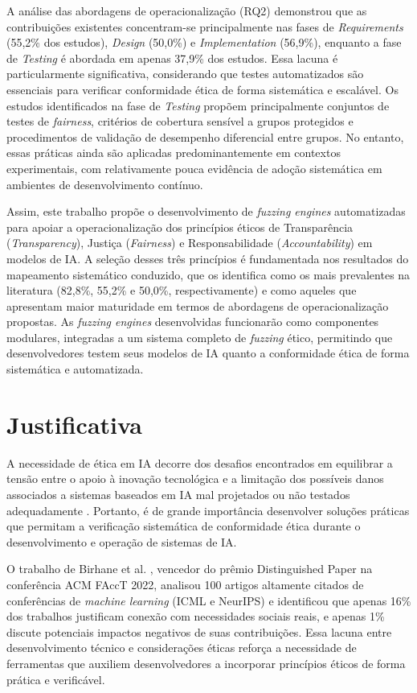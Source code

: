 A análise das abordagens de operacionalização (RQ2) demonstrou que as contribuições existentes concentram-se principalmente nas fases de \textit{Requirements} (55,2\% dos estudos), \textit{Design} (50,0\%) e \textit{Implementation} (56,9\%), enquanto a fase de \textit{Testing} é abordada em apenas 37,9\% dos estudos. Essa lacuna é particularmente significativa, considerando que testes automatizados são essenciais para verificar conformidade ética de forma sistemática e escalável. Os estudos identificados na fase de \textit{Testing} propõem principalmente conjuntos de testes de \textit{fairness}, critérios de cobertura sensível a grupos protegidos e procedimentos de validação de desempenho diferencial entre grupos. No entanto, essas práticas ainda são aplicadas predominantemente em contextos experimentais, com relativamente pouca evidência de adoção sistemática em ambientes de desenvolvimento contínuo.

Assim, este trabalho propõe o desenvolvimento de \textit{fuzzing engines} automatizadas para apoiar a operacionalização dos princípios éticos de Transparência (\textit{Transparency}), Justiça (\textit{Fairness}) e Responsabilidade (\textit{Accountability}) em modelos de IA. A seleção desses três princípios é fundamentada nos resultados do mapeamento sistemático conduzido, que os identifica como os mais prevalentes na literatura (82,8\%, 55,2\% e 50,0\%, respectivamente) e como aqueles que apresentam maior maturidade em termos de abordagens de operacionalização propostas. As \textit{fuzzing engines} desenvolvidas funcionarão como componentes modulares, integradas a um sistema completo de \textit{fuzzing} ético, permitindo que desenvolvedores testem seus modelos de IA quanto a conformidade ética de forma sistemática e automatizada.

\section{Justificativa}

A necessidade de ética em IA decorre dos desafios encontrados em equilibrar a tensão entre o apoio à inovação tecnológica e a limitação dos possíveis danos associados a sistemas baseados em IA mal projetados ou não testados adequadamente \cite{Morley2020}. Portanto, é de grande importância desenvolver soluções práticas que permitam a verificação sistemática de conformidade ética durante o desenvolvimento e operação de sistemas de IA.

O trabalho de Birhane et al. \cite{Birhane2022}, vencedor do prêmio Distinguished Paper na conferência ACM FAccT 2022, analisou 100 artigos altamente citados de conferências de \textit{machine learning} (ICML e NeurIPS) e identificou que apenas 16\% dos trabalhos justificam conexão com necessidades sociais reais, e apenas 1\% discute potenciais impactos negativos de suas contribuições. Essa lacuna entre desenvolvimento técnico e considerações éticas reforça a necessidade de ferramentas que auxiliem desenvolvedores a incorporar princípios éticos de forma prática e verificável.

